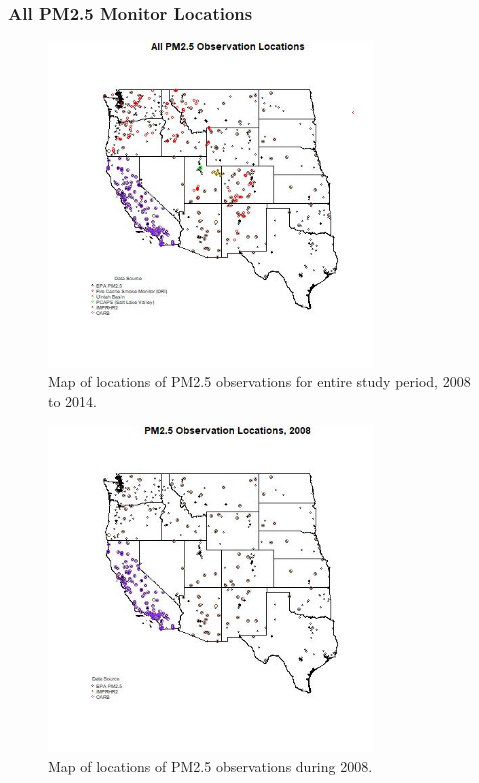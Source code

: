 
\subsubsection*{All PM2.5 Monitor Locations}
\begin{figure} 
\centering 
\includegraphics[width=0.77\textwidth]{Code_Outputs/MapPM25_All_Sitesplot_year0.jpg} 
\caption{\label{fig:MapPM25Loc0}Map of locations of PM2.5 observations for entire study period, 2008 to 2014.} 
\end{figure} 
 

\begin{figure} 
\centering 
\includegraphics[width=0.77\textwidth]{Code_Outputs/MapPM25_All_Sitesplot_year2008.jpg} 
\caption{\label{fig:MapPM25Loc2008}Map of locations of PM2.5 observations during 2008.} 
\end{figure} 
 


